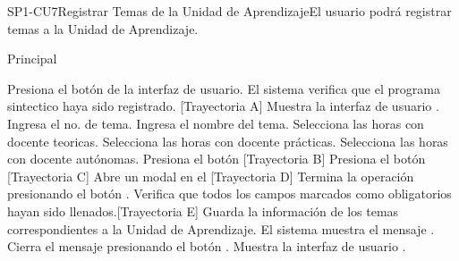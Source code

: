 \begin{UseCase}{SP1-CU7}{Registrar Temas de la Unidad de Aprendizaje}{El usuario podrá registrar temas a la Unidad de Aprendizaje.}
\end{UseCase}

\begin{UCtrayectoria}{Principal}

    \UCpaso[\UCactor] Presiona el botón  de la interfaz de usuario. 
    \UCpaso El sistema verifica que el programa sintectico haya sido registrado. [Trayectoria A]
    \UCpaso Muestra la interfaz de usuario .
    \UCpaso[\UCactor] Ingresa el no. de tema.
    \UCpaso[\UCactor] Ingresa el nombre del tema.
    \UCpaso[\UCactor] Selecciona las horas con docente teoricas.
    \UCpaso[\UCactor] Selecciona las horas con docente prácticas.
    \UCpaso[\UCactor] Selecciona las horas con docente autónomas.
    \UCpaso[\UCactor] Presiona el botón  [Trayectoria B] 
    \UCpaso[\UCactor] Presiona el botón  [Trayectoria C]
    \UCpaso Abre un modal en el  [Trayectoria D]
    \UCpaso[\UCactor] Termina la operación presionando el botón . 
    \UCpaso Verifica que todos los campos marcados como obligatorios hayan sido llenados.[Trayectoria E]
    \UCpaso Guarda la información de los temas correspondientes a la Unidad de Aprendizaje.
    \UCpaso El sistema muestra el mensaje .
    \UCpaso[\UCactor] Cierra el mensaje presionando el botón .
    \UCpaso Muestra la interfaz de usuario .
\end{UCtrayectoria}

